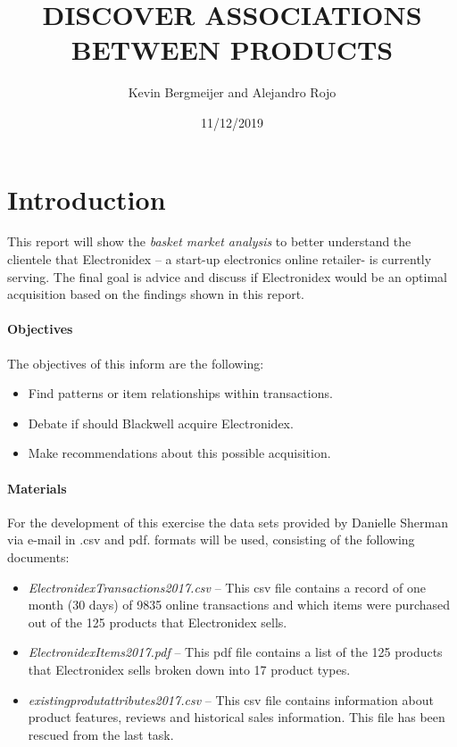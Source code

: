 \documentclass[]{article}
\title{DISCOVER ASSOCIATIONS BETWEEN PRODUCTS}
\author{Kevin Bergmeijer and Alejandro Rojo}
\date{11/12/2019}
\providecommand{\tightlist}{%
  \setlength{\itemsep}{0pt}\setlength{\parskip}{0pt}}
\let\oldparagraph\paragraph
\renewcommand{\paragraph}[1]{\oldparagraph{#1}\mbox{}}
\begin{document}
\maketitle

\hypertarget{introduction}{%
\section{Introduction}\label{introduction}}

This report will show the \emph{basket market analysis} to better
understand the clientele that Electronidex -- a start-up electronics
online retailer- is currently serving. The final goal is advice and
discuss if Electronidex would be an optimal acquisition based on the
findings shown in this report.

\hypertarget{objectives}{%
\paragraph{Objectives}\label{objectives}}

The objectives of this inform are the following:

\begin{itemize}
\tightlist
\item
  Find patterns or item relationships within transactions.
\item
  Debate if should Blackwell acquire Electronidex.
\item
  Make recommendations about this possible acquisition.
\end{itemize}

\hypertarget{materials}{%
\paragraph{Materials}\label{materials}}

For the development of this exercise the data sets provided by Danielle
Sherman via e-mail in .csv and pdf. formats will be used, consisting of
the following documents:

\begin{itemize}
\tightlist
\item
  \emph{ElectronidexTransactions2017.csv} -- This csv file contains a
  record of one month (30 days) of 9835 online transactions and which
  items were purchased out of the 125 products that Electronidex sells.
\item
  \emph{ElectronidexItems2017.pdf} -- This pdf file contains a list of
  the 125 products that Electronidex sells broken down into 17 product
  types.
\item
  \emph{existingprodutattributes2017.csv} -- This csv file contains
  information about product features, reviews and historical sales
  information. This file has been rescued from the last task.
\end{itemize}
\end{document}
